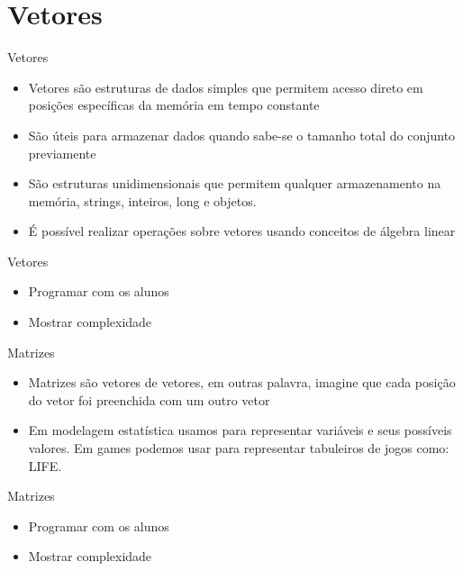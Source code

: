 \section{Vetores}

\begin{frame}
	\begin{block}{Vetores}
		\begin{itemize}
			\item Vetores são estruturas de dados simples que permitem acesso direto em posições específicas da memória em tempo constante

			\item São úteis para armazenar dados quando sabe-se o tamanho total do conjunto previamente
			
			\item São estruturas unidimensionais que permitem qualquer armazenamento na memória, strings, inteiros, long e objetos.
			
			\item É possível realizar operações sobre vetores usando conceitos de álgebra linear
		\end{itemize}
	\end{block}
\end{frame}

\begin{frame}
	\begin{block}{Vetores}
		\begin{itemize}
			\item Programar com os alunos
			\item Mostrar complexidade
		\end{itemize}
	\end{block}
\end{frame}

\begin{frame}
	\begin{block}{Matrizes}
		\begin{itemize}
			\item Matrizes são vetores de vetores, em outras palavra, imagine que cada posição do vetor foi preenchida com um outro vetor

			\item Em modelagem estatística usamos para representar variáveis e seus possíveis valores. Em games podemos usar para representar tabuleiros de jogos como: LIFE.
		\end{itemize}
	\end{block}
\end{frame}

\begin{frame}
	\begin{block}{Matrizes}
		\begin{itemize}
			\item Programar com os alunos
			\item Mostrar complexidade
		\end{itemize}
	\end{block}
\end{frame}

